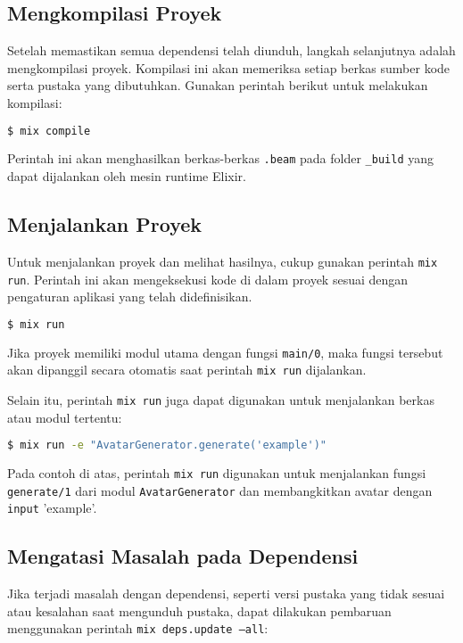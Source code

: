 \subsection{Mengkompilasi Proyek}

Setelah memastikan semua dependensi telah diunduh, langkah selanjutnya adalah mengkompilasi proyek. Kompilasi ini akan memeriksa setiap berkas sumber kode serta pustaka yang dibutuhkan. Gunakan perintah berikut untuk melakukan kompilasi:

\begin{lstlisting}[language=bash]
	$ mix compile
\end{lstlisting}

Perintah ini akan menghasilkan berkas-berkas \texttt{.beam} pada folder \texttt{\_build} yang dapat dijalankan oleh mesin runtime Elixir.

\subsection{Menjalankan Proyek}

Untuk menjalankan proyek dan melihat hasilnya, cukup gunakan perintah \texttt{mix run}. Perintah ini akan mengeksekusi kode di dalam proyek sesuai dengan pengaturan aplikasi yang telah didefinisikan.

\begin{lstlisting}[language=bash]
	$ mix run
\end{lstlisting}

Jika proyek memiliki modul utama dengan fungsi \texttt{main/0}, maka fungsi tersebut akan dipanggil secara otomatis saat perintah \texttt{mix run} dijalankan.

Selain itu, perintah \texttt{mix run} juga dapat digunakan untuk menjalankan berkas atau modul tertentu:

\begin{lstlisting}[language=bash]
	$ mix run -e "AvatarGenerator.generate('example')"
\end{lstlisting}

Pada contoh di atas, perintah \texttt{mix run} digunakan untuk menjalankan fungsi \texttt{generate/1} dari modul \texttt{AvatarGenerator} dan membangkitkan avatar dengan \texttt{input} 'example'.

\subsection{Mengatasi Masalah pada Dependensi}

Jika terjadi masalah dengan dependensi, seperti versi pustaka yang tidak sesuai atau kesalahan saat mengunduh pustaka, dapat dilakukan pembaruan menggunakan perintah \texttt{mix deps.update --all}:

